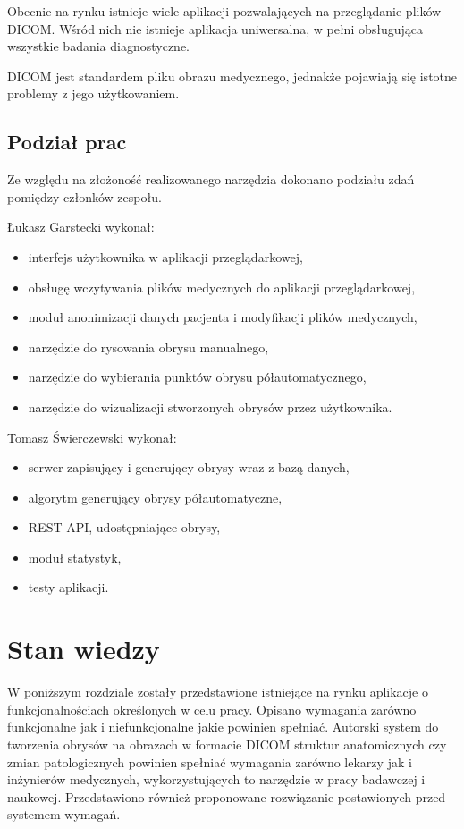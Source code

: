 \documentclass[a4paper,11pt,twoside,openright]{report}
\theoremstyle{definition}
\begin{document}
Obecnie na rynku istnieje wiele aplikacji pozwalających na przeglądanie plików DICOM.
Wśród nich nie istnieje aplikacja uniwersalna, w pełni obsługująca wszystkie badania diagnostyczne.

 DICOM jest standardem pliku obrazu medycznego, jednakże pojawiają się istotne
 problemy z jego użytkowaniem.

\section {Podział prac}

Ze względu na złożoność realizowanego narzędzia dokonano podziału zdań pomiędzy
członków zespołu.

Łukasz Garstecki wykonał:

\begin{itemize}[noitemsep]
\item interfejs użytkownika w aplikacji przeglądarkowej,
\item obsługę wczytywania plików medycznych do aplikacji przeglądarkowej,
\item moduł anonimizacji danych pacjenta i modyfikacji plików medycznych,
\item narzędzie do rysowania obrysu manualnego,
\item narzędzie do wybierania punktów obrysu półautomatycznego,
\item narzędzie do wizualizacji stworzonych obrysów przez użytkownika.
\end{itemize}

Tomasz Świerczewski wykonał:

\begin{itemize}[noitemsep]
\item serwer zapisujący i generujący obrysy wraz z bazą danych,
\item algorytm generujący obrysy półautomatyczne,
\item REST API, udostępniające obrysy,
\item moduł statystyk,
\item testy aplikacji.
\end{itemize}


\chapter {Stan wiedzy}

W poniższym rozdziale zostały przedstawione istniejące na rynku aplikacje o
funkcjonalnościach określonych w celu pracy. Opisano wymagania zarówno funkcjonalne
jak i niefunkcjonalne jakie powinien spełniać. Autorski system do tworzenia obrysów
na obrazach w formacie DICOM struktur anatomicznych czy zmian patologicznych
powinien spełniać wymagania zarówno lekarzy jak i inżynierów medycznych, wykorzystujących
to narzędzie w pracy badawczej i naukowej. Przedstawiono również proponowane rozwiązanie
postawionych przed systemem wymagań.
\end{document}
